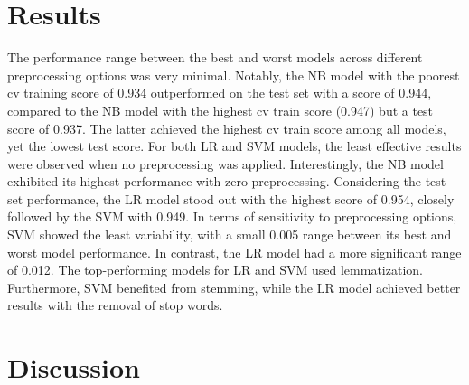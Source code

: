 \documentclass[12pt]{article}
\begin{document}
\section{Results}



The performance range between the best and worst models across different preprocessing options was very minimal. Notably, the NB model with the poorest cv training score of 0.934 outperformed on the test set with a score of 0.944, compared to the NB model with the highest cv train score (0.947) but a test score of 0.937. The latter achieved the highest cv train score among all models, yet the lowest test score. For both LR and SVM models, the least effective results were observed when no preprocessing was applied. Interestingly, the NB model exhibited its highest performance with zero preprocessing. Considering the test set performance, the LR model stood out with the highest score of 0.954, closely followed by the SVM with 0.949. In terms of sensitivity to preprocessing options, SVM showed the least variability, with a small 0.005 range between its best and worst model performance. In contrast, the LR model had a more significant range of 0.012. The top-performing models for LR and SVM used lemmatization. Furthermore, SVM benefited from stemming, while the LR model achieved better results with the removal of stop words.


\section{Discussion}



\end{document}
